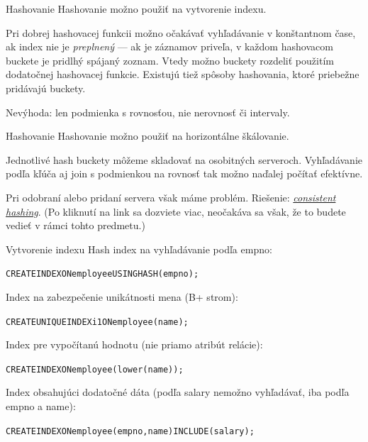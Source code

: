 \documentclass[12pt]{beamer}
\def\blue#1{\textcolor{Cerulean}{#1}}
\begin{document}
\begin{frame}[fragile]{Hashovanie}
Hashovanie možno použiť na vytvorenie indexu.
\bigskip

Pri dobrej hashovacej funkcii možno očakávať vyhľadávanie v konštantnom čase,
ak index nie je \emph{preplnený} --- ak je záznamov priveľa, v každom hashovacom buckete
je pridlhý spájaný zoznam. Vtedy možno buckety rozdeliť použitím dodatočnej hashovacej funkcie.
Existujú tiež spôsoby hashovania, ktoré priebežne pridávajú buckety.
\bigskip

Nevýhoda: len podmienka s rovnosťou, nie nerovnosť či intervaly.
\end{frame}

\begin{frame}[fragile]{Hashovanie}
Hashovanie možno použiť na horizontálne škálovanie.
\bigskip

Jednotlivé hash buckety môžeme skladovať na osobitných serveroch.
Vyhľadávanie podľa kľúča aj join s podmienkou na rovnosť tak možno naďalej počítať efektívne.
\bigskip

Pri odobraní alebo pridaní servera však máme problém. Riešenie:
\blue{\href{https://medium.datadriveninvestor.com/consistent-hashing-an-efficient-scalable-data-distribution-algorithm-a81fc5c0a6c7}{\emph{consistent hashing}}}.
(Po kliknutí na link sa dozviete viac, neočakáva sa však, že to budete vedieť v rámci tohto predmetu.)
\end{frame}

\begin{frame}[fragile]{Vytvorenie indexu}
Hash index na vyhľadávanie podľa empno:
\begin{alltt}
  \blue{CREATE INDEX ON employee USING HASH (empno);}
\end{alltt}
Index na zabezpečenie unikátnosti mena (B+ strom):
\begin{alltt}
  \blue{CREATE UNIQUE INDEX i1 ON employee (name);}
\end{alltt}
Index pre vypočítanú hodnotu (nie priamo atribút relácie):
\begin{alltt}
  \blue{CREATE INDEX ON employee (lower(name));}
\end{alltt}
Index obsahujúci dodatočné dáta (podľa salary nemožno vyhľadávať, iba podľa empno a name):
{\small
\begin{alltt}
  \blue{CREATE INDEX ON employee (empno, name) INCLUDE (salary);}
\end{alltt}
}
\end{frame}
\end{document}
